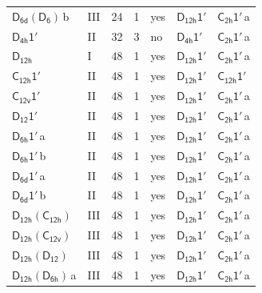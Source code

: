 \documentclass[10pt,a4paper]{article}
\numberwithin{equation}{section}
\newcommand{\grp}[1]{\mathsf{#1}}
\newcommand{\clsletter}[1]{\,{\scriptsize\color{black!55}#1}}
\begin{document}
{\begin{longtable}{@{}llrrlll@{}}
\href{D6d-D6.pdf}{$\grp{D_{6d}}(\grp{D_{6}})$}\clsletter{b} & III & 24 & 1 & yes & \href{D12h-1p.pdf}{$\grp{D_{12h}1'}$} & \href{C2h-1p.pdf}{$\grp{C_{2h}1'}$}\clsletter{a}\\
\href{D4h-1p.pdf}{$\grp{D_{4h}1'}$} & II & 32 & 3 & no & \href{D4h-1p.pdf}{$\grp{D_{4h}1'}$} & \href{C2h-1p.pdf}{$\grp{C_{2h}1'}$}\clsletter{a}\\
\href{../../../rotation/data/pdf/D12h.pdf}{$\grp{D_{12h}}$} & I & 48 & 1 & yes & \href{D12h-1p.pdf}{$\grp{D_{12h}1'}$} & \href{C2h-1p.pdf}{$\grp{C_{2h}1'}$}\clsletter{a}\\
\href{C12h-1p.pdf}{$\grp{C_{12h}1'}$} & II & 48 & 1 & yes & \href{D12h-1p.pdf}{$\grp{D_{12h}1'}$} & \href{C12h-1p.pdf}{$\grp{C_{12h}1'}$}\\
\href{C12v-1p.pdf}{$\grp{C_{12v}1'}$} & II & 48 & 1 & yes & \href{D12h-1p.pdf}{$\grp{D_{12h}1'}$} & \href{C2h-1p.pdf}{$\grp{C_{2h}1'}$}\clsletter{a}\\
\href{D12-1p.pdf}{$\grp{D_{12}1'}$} & II & 48 & 1 & yes & \href{D12h-1p.pdf}{$\grp{D_{12h}1'}$} & \href{C2h-1p.pdf}{$\grp{C_{2h}1'}$}\clsletter{a}\\
\href{D6h-1p.pdf}{$\grp{D_{6h}1'}$}\clsletter{a} & II & 48 & 1 & yes & \href{D12h-1p.pdf}{$\grp{D_{12h}1'}$} & \href{C2h-1p.pdf}{$\grp{C_{2h}1'}$}\clsletter{a}\\
\href{D6h-1p.pdf}{$\grp{D_{6h}1'}$}\clsletter{b} & II & 48 & 1 & yes & \href{D12h-1p.pdf}{$\grp{D_{12h}1'}$} & \href{C2h-1p.pdf}{$\grp{C_{2h}1'}$}\clsletter{a}\\
\href{D6d-1p.pdf}{$\grp{D_{6d}1'}$}\clsletter{a} & II & 48 & 1 & yes & \href{D12h-1p.pdf}{$\grp{D_{12h}1'}$} & \href{C2h-1p.pdf}{$\grp{C_{2h}1'}$}\clsletter{a}\\
\href{D6d-1p.pdf}{$\grp{D_{6d}1'}$}\clsletter{b} & II & 48 & 1 & yes & \href{D12h-1p.pdf}{$\grp{D_{12h}1'}$} & \href{C2h-1p.pdf}{$\grp{C_{2h}1'}$}\clsletter{a}\\
\href{D12h-C12h.pdf}{$\grp{D_{12h}}(\grp{C_{12h}})$} & III & 48 & 1 & yes & \href{D12h-1p.pdf}{$\grp{D_{12h}1'}$} & \href{C2h-1p.pdf}{$\grp{C_{2h}1'}$}\clsletter{a}\\
\href{D12h-C12v.pdf}{$\grp{D_{12h}}(\grp{C_{12v}})$} & III & 48 & 1 & yes & \href{D12h-1p.pdf}{$\grp{D_{12h}1'}$} & \href{C2h-1p.pdf}{$\grp{C_{2h}1'}$}\clsletter{a}\\
\href{D12h-D12.pdf}{$\grp{D_{12h}}(\grp{D_{12}})$} & III & 48 & 1 & yes & \href{D12h-1p.pdf}{$\grp{D_{12h}1'}$} & \href{C2h-1p.pdf}{$\grp{C_{2h}1'}$}\clsletter{a}\\
\href{D12h-D6h.pdf}{$\grp{D_{12h}}(\grp{D_{6h}})$}\clsletter{a} & III & 48 & 1 & yes & \href{D12h-1p.pdf}{$\grp{D_{12h}1'}$} & \href{C2h-1p.pdf}{$\grp{C_{2h}1'}$}\clsletter{a}\\

\end{longtable}}
\end{document}
